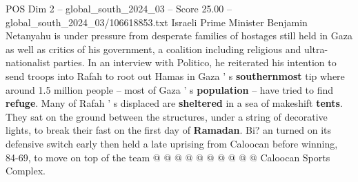\begin{textsample}{POS Dim 2 – global\_south\_2024\_03 – Score 25.00 – global\_south\_2024\_03/106618853.txt}
Israeli Prime Minister Benjamin Netanyahu is under pressure from desperate families of hostages still held in Gaza as well as critics of his government, a coalition including religious and ultra-nationalist parties.
In an interview with Politico, he reiterated his intention to send troops into Rafah to root out Hamas in Gaza ' s \textbf{southernmost} tip where around 1.5 million people -- most of Gaza ' s \textbf{population} -- have tried to find \textbf{refuge}.
Many of Rafah ' s displaced are \textbf{sheltered} in a sea of makeshift \textbf{tents}.
They sat on the ground between the structures, under a string of decorative lights, to break their fast on the first day of \textbf{Ramadan}.
Bi? an turned on its defensive switch early then held a late uprising from Caloocan before winning, 84-69, to move on top of the team @ @ @ @ @ @ @ @ @ @ Caloocan Sports Complex.

\end{textsample}
